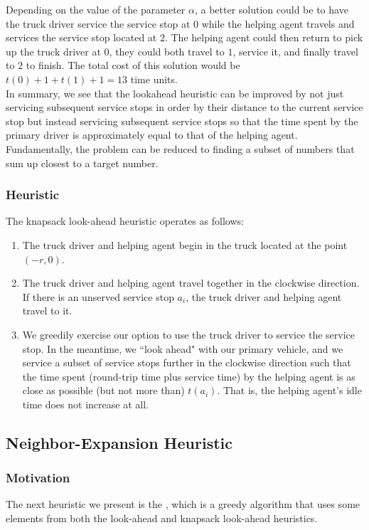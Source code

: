 \documentclass[12pt]{scrartcl}
\begin{document}
Depending on the value of the parameter $\alpha$, a better solution could be to have the truck driver service the service stop at $0$ while the helping agent travels and services the service stop located at $2$. The helping agent could then return to pick up the truck driver at $0$, they could both travel to $1$, service it, and finally travel to $2$ to finish. The total cost of this solution would be $t(0) + 1 + t(1) + 1 = 13$ time units. \\

In summary, we see that the lookahead heuristic can be improved by not just servicing subsequent service stops in order by their distance to the current service stop but instead servicing subsequent service stops so that the time spent by the primary driver is approximately equal to that of the helping agent. Fundamentally, the problem can be reduced to finding a subset of numbers that sum up closest to a target number. 

\subsubsection{Heuristic}
The knapsack look-ahead heuristic operates as follows:

\begin{enumerate}
    \item The truck driver and helping agent begin in the truck located at the point $(-r, 0)$.
    \item The truck driver and helping agent travel together in the clockwise direction. If there is an unserved service stop $a_i$, the truck driver and helping agent travel to it.
		\item We greedily exercise our option to use the truck driver to service the service stop. In the meantime, we ``look ahead" with our primary vehicle, and we service a subset of service stops further in the clockwise direction such that the time spent (round-trip time plus service time) by the helping agent is as close as possible (but not more than) $t(a_i)$. That is, the helping agent's idle time does not increase at all. 
\end{enumerate}

\iffalse
TODO: discuss benefits
\fi


\subsection{Neighbor-Expansion Heuristic}
\subsubsection{Motivation}
The next heuristic we present is the , which is a greedy algorithm that uses some elements from both the look-ahead and knapsack look-ahead heuristics. \\
\end{document}
